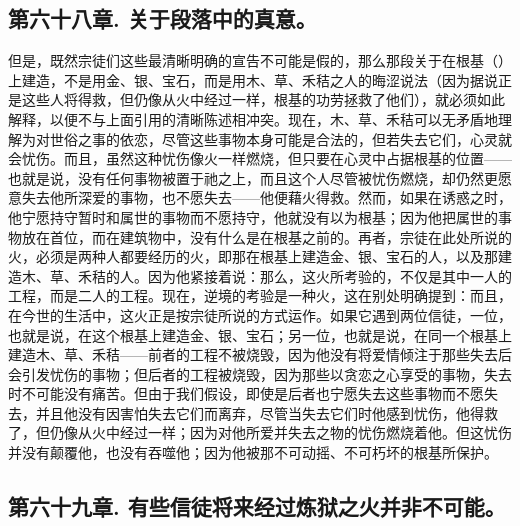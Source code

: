 
\subsection{第六十八章. 关于段落中的真意。}

但是，既然宗徒们这些最清晰明确的宣告不可能是假的，那么那段关于在根基（）上建造，不是用金、银、宝石，而是用木、草、禾秸之人的晦涩说法（因为据说正是这些人将得救，但仍像从火中经过一样，根基的功劳拯救了他们），就必须如此解释，以便不与上面引用的清晰陈述相冲突。现在，木、草、禾秸可以无矛盾地理解为对世俗之事的依恋，尽管这些事物本身可能是合法的，但若失去它们，心灵就会忧伤。而且，虽然这种忧伤像火一样燃烧，但只要在心灵中占据根基的位置——也就是说，没有任何事物被置于祂之上，而且这个人尽管被忧伤燃烧，却仍然更愿意失去他所深爱的事物，也不愿失去——他便藉火得救。然而，如果在诱惑之时，他宁愿持守暂时和属世的事物而不愿持守，他就没有以为根基；因为他把属世的事物放在首位，而在建筑物中，没有什么是在根基之前的。再者，宗徒在此处所说的火，必须是两种人都要经历的火，即那在根基上建造金、银、宝石的人，以及那建造木、草、禾秸的人。因为他紧接着说：那么，这火所考验的，不仅是其中一人的工程，而是二人的工程。现在，逆境的考验是一种火，这在别处明确提到：而且，在今世的生活中，这火正是按宗徒所说的方式运作。如果它遇到两位信徒，一位，也就是说，在这个根基上建造金、银、宝石；另一位，也就是说，在同一个根基上建造木、草、禾秸——前者的工程不被烧毁，因为他没有将爱情倾注于那些失去后会引发忧伤的事物；但后者的工程被烧毁，因为那些以贪恋之心享受的事物，失去时不可能没有痛苦。但由于我们假设，即使是后者也宁愿失去这些事物而不愿失去，并且他没有因害怕失去它们而离弃，尽管当失去它们时他感到忧伤，他得救了，但仍像从火中经过一样；因为对他所爱并失去之物的忧伤燃烧着他。但这忧伤并没有颠覆他，也没有吞噬他；因为他被那不可动摇、不可朽坏的根基所保护。\par


\subsection{第六十九章. 有些信徒将来经过炼狱之火并非不可能。}

